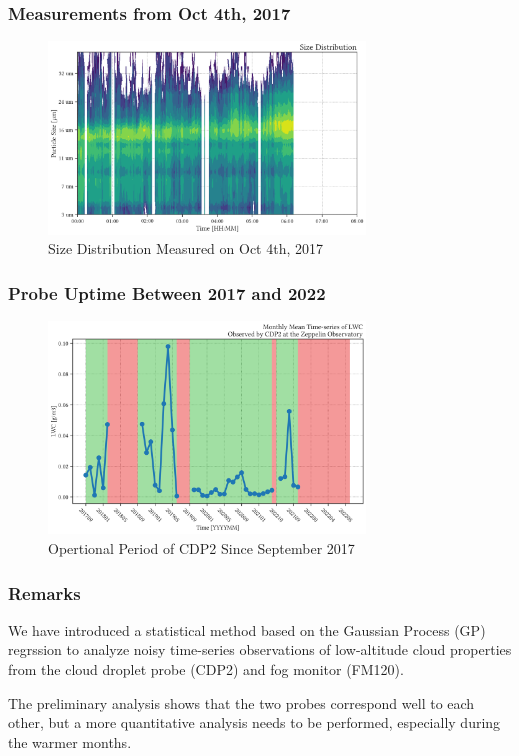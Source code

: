 \documentclass{beamer}
\begin{document}
\begin{frame}
    \frametitle{Measurements from Oct 4th, 2017}
    \begin{figure}
        \centering
        \includegraphics[width=0.75\textwidth]{img/size.png}
        \caption{ Size Distribution Measured on Oct 4th, 2017 }
    \end{figure}
\end{frame}

\begin{frame}
    \frametitle{Probe Uptime Between 2017 and 2022}
    \begin{figure}
        \centering
        \includegraphics[width=0.75\textwidth]{img/monthly.png}
        \caption{ Opertional Period of CDP2 Since September 2017 }
    \end{figure}
\end{frame}

\begin{frame}
    \frametitle{Remarks}
    We have introduced a statistical method based on the Gaussian Process (GP) regrssion to analyze noisy time-series observations of low-altitude cloud properties from the cloud droplet probe (CDP2) and fog monitor (FM120). 
    
    The preliminary analysis shows that the two probes correspond well to each other, but a more quantitative analysis needs to be performed, especially during the warmer months.
\end{frame}
\end{document}
